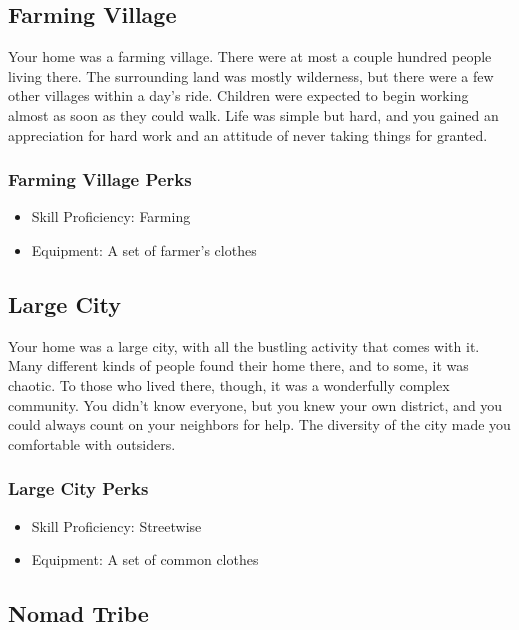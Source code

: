 \begin{multicols}{2}
\subsection{Farming Village}

Your home was a farming village. There were at most a couple hundred
people living there. The surrounding land was mostly wilderness, but
there were a few other villages within a day's ride. Children were
expected to begin working almost as soon as they could walk. Life was
simple but hard, and you gained an appreciation for hard work and
an attitude of never taking things for granted.

\subsubsection{Farming Village Perks}

\begin{itemize}
  \item Skill Proficiency: Farming
  \item Equipment: A set of farmer's clothes
\end{itemize}

\subsection{Large City}

Your home was a large city, with all the bustling activity that comes
with it. Many different kinds of people found their home there, and
to some, it was chaotic. To those who lived there, though, it was a
wonderfully complex community. You didn't know everyone, but you knew
your own district, and you could always count on your neighbors for
help. The diversity of the city made you comfortable with outsiders.

\subsubsection{Large City Perks}

\begin{itemize}
  \item Skill Proficiency: Streetwise
  \item Equipment: A set of common clothes
\end{itemize}

\subsection{Nomad Tribe}


\end{multicols}
